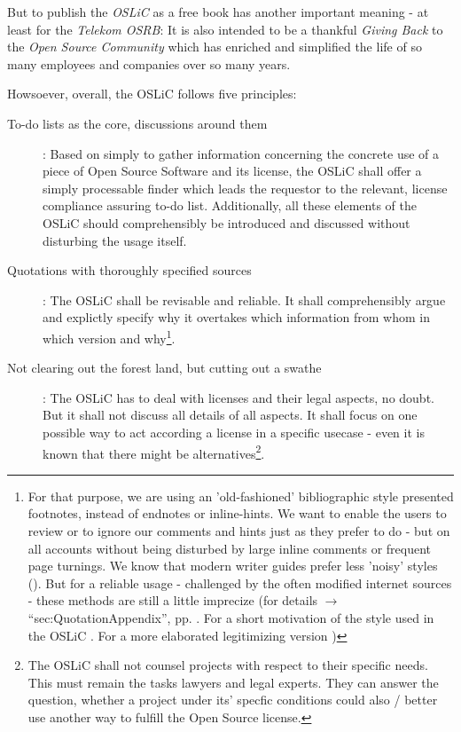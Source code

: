 But to publish the \emph{OSLiC} as a free book has another important meaning -
at least for the \emph{Telekom OSRB}: It is also intended to be a thankful
\emph{Giving Back} to the \emph{Open Source Community} which has enriched and
simplified the life of so many employees and companies over so many years.

Howsoever, overall, the OSLiC follows five principles:

\begin{description}
  \item[To-do lists as the core, discussions around them]: Based on simply to
  gather information concerning the concrete use of a piece of Open Source
  Software and its license, the OSLiC shall offer a simply processable finder
  which leads the requestor to the relevant, license compliance assuring to-do
  list. Additionally, all these elements of the OSLiC should comprehensibly
  be introduced and discussed without disturbing the usage itself.

  \item[Quotations with thoroughly specified sources]\label{QuotationPrinciple}:
  The OSLiC shall be revisable and reliable. It shall comprehensibly argue and
  explictly specify why it overtakes which information from whom in which
  version and why\footnote{For that purpose, we are using an 'old-fashioned'
  bibliographic style presented footnotes, instead of endnotes or inline-hints.
  We want to enable the users to review or to ignore our comments and hints just
  as they prefer to do - but on all accounts without being disturbed by large
  inline comments or frequent page turnings. We know that modern writer guides
  prefer less 'noisy' styles (\cite[pars pro toto cf.][\nopage
  passim]{Mla2009a}). But for a reliable usage - challenged by the often
  modified internet sources - these methods are still a little imprecize (for
  details $\rightarrow$ \enquote{sec:QuotationAppendix}, pp.
  \pageref{sec:QuotationAppendix} . For a short motivation of the style used in
  the OSLiC \cite[cf.][\nopage passim]{Reincke2012a}. For a more elaborated
  legitimizing version \cite[cf.][\nopage passim]{Reincke2012b}) }.

 \item[Not clearing out the forest land, but cutting out a swathe]: The OSLiC
  has to deal with licenses and their legal aspects, no doubt. But it shall not
  discuss all details of all aspects. It shall focus on one possible way to act
  according a license in a specific usecase - even it is known that there might
  be alternatives\footnote{The OSLiC shall not counsel projects with respect to
  their specific needs. This must remain the tasks lawyers and legal experts.
  They can answer the question, whether a project under its' specfic conditions
  could also / better use another way to fulfill the Open Source license.}.
  

\end{description}
